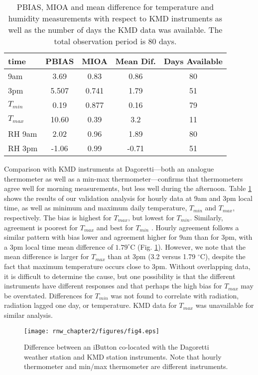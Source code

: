 \begin{table}
\centering
\begin{tabular}{ l | c | c | c | c }
\toprule
     time & PBIAS & MIOA & Mean Dif. & Days Available\\ 
     \midrule
    9am &  3.69 & 0.83 & 0.86 & 80 \\ 
    3pm & 5.507 & 0.741 & 1.79 & 51\\
    $T_{min}$ &  0.19 & 0.877 & 0.16 & 79\\
    $T_{max}$ & 10.60 & 0.39 & 3.2 & 11\\
    RH 9am & 2.02 & 0.96 & 1.89 & 80\\
    RH 3pm &-1.06  & 0.99 & -0.71 & 51\\ 
    \bottomrule
\end{tabular}

\caption{PBIAS, MIOA and mean difference for temperature and humidity measurements with respect to KMD instruments as well as the number of days the KMD data was available. The total observation period is 80 days.}
\label{tab:validation}
\end{table}

Comparison with KMD instruments at Dagoretti---both an analogue thermometer as well as a min-max thermometer---confirms that thermometers agree well for morning measurements, but less well during the afternoon.
Table \ref{tab:validation} shows the results of our validation analysis for hourly data at 9am and 3pm local time, as well as minimum and maximum daily temperature, $T_{min}$ and $T_{max}$, respectively.
 The bias is highest for $T_{max}$, but lowest for $T_{min}$. Similarly, agreement is poorest for $T_{max}$ and best for $T_{min}$ . 
Hourly agreement follows a similar pattern with bias lower and agreement higher for 9am than for 3pm, with a 3pm local time mean difference of $1.79^\circ$C (Fig. \ref{validation}). However, we note that the mean difference is larger for $T_{max}$ than at 3pm (3.2 versus 1.79 $^\circ$C), despite the fact that maximum temperature occurs close to 3pm. Without overlapping data, it is difficult to determine the cause, but one possibility is that the different instruments have different responses and that perhaps the high bias for $T_{max}$ may be overstated. 
Differences for $T_{min}$ was not found to correlate with radiation, radiation lagged one day, or temperature. KMD data for $T_{max}$ was unavailable for similar analysis. 


\begin{figure}
\texttt{[image: rnw\_chapter2/figures/fig4.eps]}
\caption{Difference between an iButton co-located with the Dagoretti weather station and KMD station instruments. Note that hourly thermometer and min/max thermometer are different instruments.}

\label{validation}
\end{figure}

